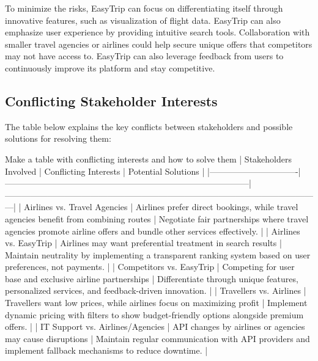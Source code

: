 To minimize the risks, EasyTrip can focus on differentiating itself through innovative features, such as visualization of flight data. EasyTrip can also emphasize user experience by providing intuitive search tools. Collaboration with smaller travel agencies or airlines could help secure unique offers that competitors may not have access to. EasyTrip can also leverage feedback from users to continuously improve its platform and stay competitive.


\subsection{Conflicting Stakeholder Interests}
The table below explains the key conflicts between stakeholders and possible solutions for resolving them:


Make a table with conflicting interests and how to solve them
| Stakeholders Involved          | Conflicting Interests                                                                 | Potential Solutions                                                                                          |
|-------------------------------|--------------------------------------------------------------------------------------|---------------------------------------------------------------------------------------------------------------|
| Airlines vs. Travel Agencies   | Airlines prefer direct bookings, while travel agencies benefit from combining routes | Negotiate fair partnerships where travel agencies promote airline offers and bundle other services effectively. |
| Airlines vs. EasyTrip          | Airlines may want preferential treatment in search results                          | Maintain neutrality by implementing a transparent ranking system based on user preferences, not payments.     |
| Competitors vs. EasyTrip       | Competing for user base and exclusive airline partnerships                          | Differentiate through unique features, personalized services, and feedback-driven innovation.                 |
| Travellers vs. Airlines        | Travellers want low prices, while airlines focus on maximizing profit                | Implement dynamic pricing with filters to show budget-friendly options alongside premium offers.               |
| IT Support vs. Airlines/Agencies | API changes by airlines or agencies may cause disruptions                         | Maintain regular communication with API providers and implement fallback mechanisms to reduce downtime.       |


